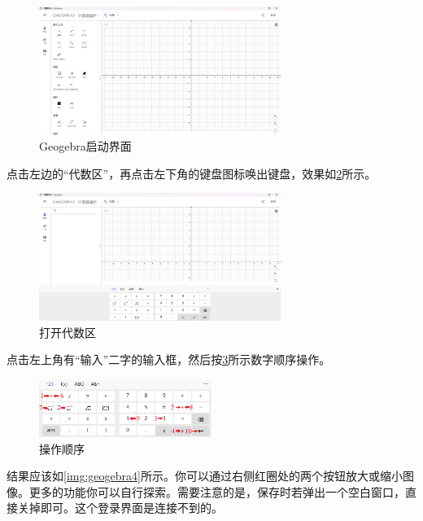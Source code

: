 \documentclass[lang=cn,math=cm,chinesefont=nofont,11pt,scheme=chinese,onecol]{elegantbook}
\begin{document}
\begin{figure}[h]
  \centering
  \includegraphics[width=0.7\textwidth]{image/geogebra1.png}
  \caption{Geogebra启动界面}
  \label{img:geogebra1}
\end{figure}



\hspace*{\fill}

点击左边的“代数区”，再点击左下角的键盘图标唤出键盘，效果如\ref{img:geogebra2}所示。

\begin{figure}[h]
  \centering
  \includegraphics[width=0.7\textwidth]{image/geogebra2.png}
  \caption{打开代数区}
  \label{img:geogebra2}
\end{figure}

点击左上角有“输入”二字的输入框，然后按\ref{img:geogebra3}所示数字顺序操作。

\begin{figure}[h]
  \centering
  \includegraphics[width=0.5\textwidth]{image/geogebra3.png}
  \caption{操作顺序}
  \label{img:geogebra3}
\end{figure}

结果应该如\ref{img:geogebra4}所示。你可以通过右侧红圈处的两个按钮放大或缩小图像。更多的功能你可以自行探索。需要注意的是，保存时若弹出一个空白窗口，直接关掉即可。这个登录界面是连接不到的。
\end{document}

